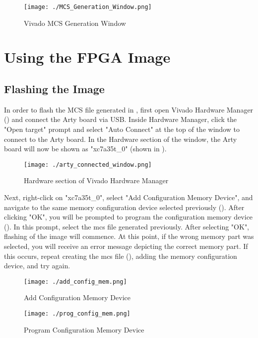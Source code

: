 \begin{figure}[h!tbp]
  \centering
  \texttt{[image: ./MCS\_Generation\_Window.png]}
  \caption{Vivado MCS Generation Window}
  \label{fig:Vivado_MCS_Window}
\end{figure}

\section{Using the FPGA Image}\label{sec:Using_FPGA_Image}
\subsection{Flashing the Image}\label{sec:Flash_FPGA_Image}
In order to flash the MCS file generated in , first open Vivado Hardware Manager () and connect the Arty board via USB.
Inside Hardware Manager, click the "Open target" prompt and select "Auto Connect" at the top of the window to connect to the Arty board.
In the Hardware section of the window, the Arty board will now be shown as "xc7a35t\_0" (shown in ).

\begin{figure}[h!tbp]
  \centering
  \texttt{[image: ./arty\_connected\_window.png]}
  \caption{Hardware section of Vivado Hardware Manager}
  \label{fig:Vivado_HW_connected}
\end{figure}

Next, right-click on "xc7a35t\_0", select "Add Configuration Memory Device", and navigate to the same memory configuration device selected previously ().
After clicking "OK", you will be prompted to program the configuration memory device ().
In this prompt, select the \Gls{mcs} file generated previously.
After selecting "OK", flashing of the image will commence.
At this point, if the wrong memory part was selected, you will receive an error message depicting the correct memory part.
If this occurs, repeat creating the \Gls{mcs} file (), adding the memory configuration device, and try again.

\begin{figure}[h!tbp]
  \centering
  \texttt{[image: ./add\_config\_mem.png]}
  \caption{Add Configuration Memory Device}
  \label{fig:add_config_mem}
\end{figure}

\begin{figure}[h!tbp]
  \centering
  \texttt{[image: ./prog\_config\_mem.png]}
  \caption{Program Configuration Memory Device}
  \label{fig:prog_config_mem}
\end{figure}

